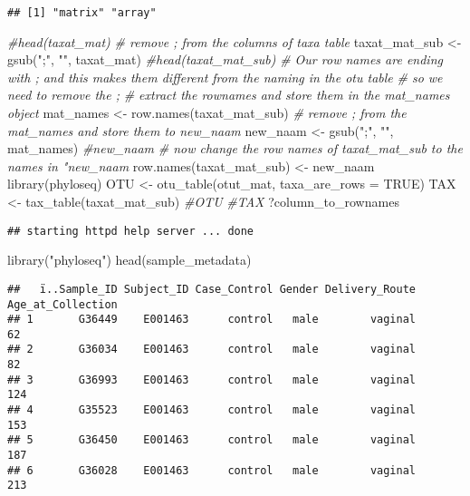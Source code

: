 \documentclass[
]{article}
\newenvironment{Shaded}{\begin{snugshade}}{\end{snugshade}}
\newcommand{\AttributeTok}[1]{\textcolor[rgb]{0.77,0.63,0.00}{#1}}
\newcommand{\CommentTok}[1]{\textcolor[rgb]{0.56,0.35,0.01}{\textit{#1}}}
\newcommand{\ConstantTok}[1]{\textcolor[rgb]{0.00,0.00,0.00}{#1}}
\newcommand{\FunctionTok}[1]{\textcolor[rgb]{0.00,0.00,0.00}{#1}}
\newcommand{\NormalTok}[1]{#1}
\newcommand{\OtherTok}[1]{\textcolor[rgb]{0.56,0.35,0.01}{#1}}
\newcommand{\StringTok}[1]{\textcolor[rgb]{0.31,0.60,0.02}{#1}}
\begin{document}
\begin{verbatim}
## [1] "matrix" "array"
\end{verbatim}

\begin{Shaded}
\begin{Highlighting}[]
\CommentTok{\#head(taxat\_mat)}
\CommentTok{\# remove ; from the columns of taxa table}
\NormalTok{taxat\_mat\_sub }\OtherTok{\textless{}{-}} \FunctionTok{gsub}\NormalTok{(}\StringTok{";"}\NormalTok{, }\StringTok{""}\NormalTok{, taxat\_mat) }
\CommentTok{\#head(taxat\_mat\_sub)}
\CommentTok{\# Our row names are ending with ; and this makes them different from the naming in the otu table}
\CommentTok{\# so we need to remove the ;}
\CommentTok{\# extract the rownames and store them in the mat\_names object}
\NormalTok{mat\_names }\OtherTok{\textless{}{-}} \FunctionTok{row.names}\NormalTok{(taxat\_mat\_sub) }
\CommentTok{\# remove ; from the mat\_names and store them to new\_naam}
\NormalTok{new\_naam }\OtherTok{\textless{}{-}} \FunctionTok{gsub}\NormalTok{(}\StringTok{";"}\NormalTok{, }\StringTok{""}\NormalTok{, mat\_names)}
\CommentTok{\#new\_naam}
\CommentTok{\# now change the row names of taxat\_mat\_sub to the names in "new\_naam}
\FunctionTok{row.names}\NormalTok{(taxat\_mat\_sub) }\OtherTok{\textless{}{-}}\NormalTok{ new\_naam }
\FunctionTok{library}\NormalTok{(phyloseq)}
\NormalTok{OTU }\OtherTok{\textless{}{-}} \FunctionTok{otu\_table}\NormalTok{(otut\_mat, }\AttributeTok{taxa\_are\_rows =} \ConstantTok{TRUE}\NormalTok{)}
\NormalTok{TAX }\OtherTok{\textless{}{-}} \FunctionTok{tax\_table}\NormalTok{(taxat\_mat\_sub)}
\CommentTok{\#OTU}
\CommentTok{\#TAX}
\NormalTok{?column\_to\_rownames}
\end{Highlighting}
\end{Shaded}

\begin{verbatim}
## starting httpd help server ... done
\end{verbatim}

\begin{Shaded}
\begin{Highlighting}[]
\FunctionTok{library}\NormalTok{(}\StringTok{"phyloseq"}\NormalTok{)}
\FunctionTok{head}\NormalTok{(sample\_metadata)}
\end{Highlighting}
\end{Shaded}

\begin{verbatim}
##   ï..Sample_ID Subject_ID Case_Control Gender Delivery_Route Age_at_Collection
## 1       G36449    E001463      control   male        vaginal                62
## 2       G36034    E001463      control   male        vaginal                82
## 3       G36993    E001463      control   male        vaginal               124
## 4       G35523    E001463      control   male        vaginal               153
## 5       G36450    E001463      control   male        vaginal               187
## 6       G36028    E001463      control   male        vaginal               213
\end{verbatim}
\end{document}
